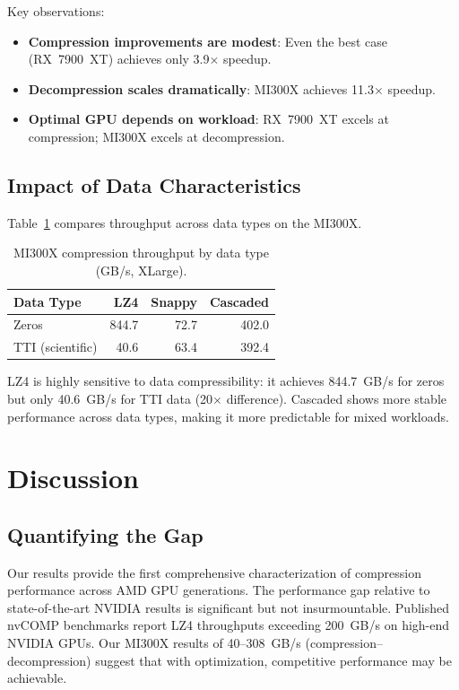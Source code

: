 \documentclass[runningheads]{llncs}
\begin{document}
Key observations:
\begin{itemize}
    \item \textbf{Compression improvements are modest}: Even the best case (RX~7900~XT) achieves only 3.9$\times$ speedup.
    \item \textbf{Decompression scales dramatically}: MI300X achieves 11.3$\times$ speedup.
    \item \textbf{Optimal GPU depends on workload}: RX~7900~XT excels at compression; MI300X excels at decompression.
\end{itemize}

\subsection{Impact of Data Characteristics}

Table~\ref{tab:data_impact} compares throughput across data types on the MI300X.

\begin{table}[t]
\centering
\caption{MI300X compression throughput by data type (GB/s, XLarge).}
\label{tab:data_impact}
\begin{tabular}{lrrr}
\toprule
\textbf{Data Type} & \textbf{LZ4} & \textbf{Snappy} & \textbf{Cascaded} \\
\midrule
Zeros & 844.7 & 72.7 & 402.0 \\
TTI (scientific) & 40.6 & 63.4 & 392.4 \\
\bottomrule
\end{tabular}
\end{table}

LZ4 is highly sensitive to data compressibility: it achieves 844.7~GB/s for zeros but only 40.6~GB/s for TTI data (20$\times$ difference). Cascaded shows more stable performance across data types, making it more predictable for mixed workloads.




%



\section{Discussion}
\label{sec:discussion}

\subsection{Quantifying the Gap}

Our results provide the first comprehensive characterization of compression performance across AMD GPU generations. The performance gap relative to state-of-the-art NVIDIA results is significant but not insurmountable. Published nvCOMP benchmarks report LZ4 throughputs exceeding 200~GB/s on high-end NVIDIA GPUs. Our MI300X results of 40--308~GB/s (compression--decompression) suggest that with optimization, competitive performance may be achievable.
\end{document}
